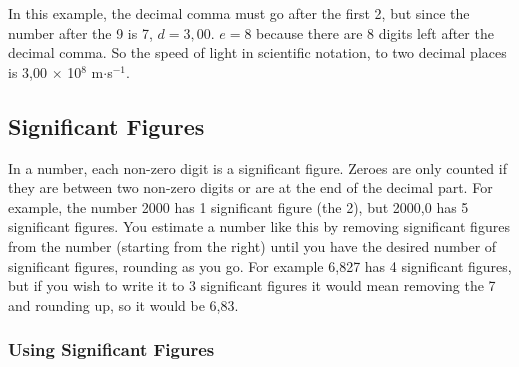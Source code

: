         \label{m30853*id64849}In this example, the decimal comma must go after the first 2, but since the number after the 9 is 7, \begin{math}d=3,00\end{math}. \begin{math}e=8\end{math} because there are 8 digits left after the decimal comma. So the speed of light in scientific notation, to two decimal places is 3,00 \begin{math}\ensuremath{\times}\end{math} 10\begin{math}{}^{8}\end{math} m\begin{math}\ensuremath{\cdot}\end{math}s\begin{math}{}^{-1}\end{math}.\par 
      
      \label{m30853*uid19}
            \subsection{ Significant Figures}
            \nopagebreak
            
        
        \label{m30853*id64942}In a number, each non-zero digit is a significant figure. Zeroes are only counted if they are between two non-zero digits or are at the end of the decimal part. For example, the number 2000 has 1 significant figure (the 2), but 2000,0 has 5 significant figures. You estimate a number like this by removing significant figures from the number (starting from the right) until you have the desired number of significant figures, rounding as you go. For example 6,827 has 4 significant figures, but if you wish to write it to 3 significant figures it would mean removing the 7 and rounding up, so it would be 6,83.\par 
\label{m30853*secfhsst!!!underscore!!!id669}
            \subsubsection{  Using Significant Figures }
            \nopagebreak
            
